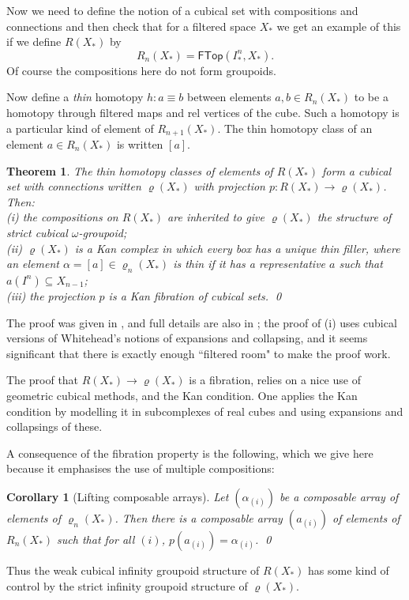 \documentclass{elsarticle}
\newtheorem{theorem}[example]{Theorem}
{\theorembodyfont{\rmfamily}\newtheorem{rem}[example]{Remark}}
\newtheorem{cor}[example]{Corollary}
\def\FTop{\mathsf{FTop}}
\def\rho{\varrho}
\begin{document}
Now we need to define the notion of a cubical set with compositions and connections and
then check that for a filtered space $X_*$  we get an example of this if we define $R(X _* )$  by
$$ R_n(X_*) = \FTop(I^n_*, X_*).$$
Of course the compositions here do not form groupoids.

Now define a {\it thin} homotopy $h: a \equiv b$ between elements $a,b \in R_n(X_*)$  to be a homotopy through filtered maps and rel vertices of the cube.  Such a homotopy is a particular kind of element of $R_{n+1}(X_*)$. The thin homotopy class of an element $a \in R_n(X_*)$ is written $[a]$.
\begin{theorem} \label{thm:rho} The thin homotopy classes of elements of $R(X_*)$ form a cubical set with connections written $\rho(X_*)$ with projection
$p: R(X_*)  \to \rho(X_*)$. Then: \\
(i) the compositions on $R(X_*)$ are inherited to give $\rho(X_*)$ the structure of strict cubical $\omega$-groupoid;\\
(ii) $\rho(X_*)$ is a Kan complex in which every box has a unique thin filler,  where an element
$\alpha  = [a] \in \rho_n(X_*)$ is  \emph{thin} if it has a representative $a$  such that $a(I^ n ) \subseteq X_{ n -1}$;\\
(iii) the projection $p$ is a Kan fibration of cubical sets.  \qed
\end{theorem}
The proof was given in \cite{BH81:col}, and full details are also in \cite{BHS};   the proof of (i) uses cubical versions of Whitehead's notions of expansions and collapsing,
and it seems significant  that there is exactly enough ``filtered room"  to make the proof work.

The proof  that $R(X_*)\to  \rho(X_*)$ is a fibration, relies on a nice
use of geometric cubical methods, and the Kan condition.  One applies the Kan condition by
modelling it in subcomplexes of real cubes and using expansions and collapsings of these.

A consequence of the  fibration property is the following, which we give here because
it emphasises the use of multiple compositions:

\begin{cor}[Lifting composable arrays]  Let $(\alpha_{(i)} )$  be a composable array of elements
of $\rho_n(X_*)$. Then there is a composable array $(a_{(i)})$  of elements of $R_ n(X_* )$  such that for all $(i)$,
$p(a_{ (i) } ) = \alpha _{(i) }$. \qed
\end{cor}
Thus the weak cubical infinity groupoid structure of $R(X _* )$  has some kind of control by the
strict infinity groupoid structure of $ \rho(X_*  )$.
\end{document}
